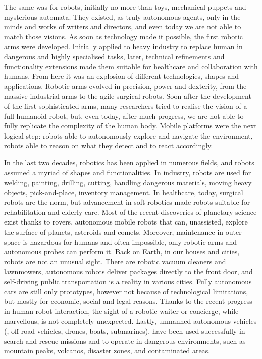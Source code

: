 The same was for robots, initially no more than toys, mechanical puppets and mysterious automata. They existed, as truly autonomous agents, only in the minds and works of writers and directors, and even today we are not able to match those visions. As soon as technology made it possible, the first robotic arms were developed. Initially applied to heavy industry to replace human in dangerous and highly specialised tasks, later, technical refinements and functionality extensions made them suitable for healthcare and collaboration with humans. From here it was an explosion of different technologies, shapes and applications. Robotic arms evolved in precision, power and dexterity,  from the massive industrial arms to the agile surgical robots.  Soon after the development of the first sophisticated arms, many researchers tried to realise the vision of a full humanoid robot, but, even today, after much progress, we are not able to fully replicate the complexity of the human body. Mobile platforms were the next logical step: robots able to autonomously explore and navigate the environment, robots able to reason on what they detect and to react accordingly.

In the last two decades, robotics has been applied in numerous fields, and robots assumed a myriad of shapes and functionalities. In industry, robots are used for welding, painting, drilling, cutting, handling dangerous materials, moving heavy objects, pick-and-place, inventory management. In healthcare, today, surgical robots are the norm, but advancement in soft robotics made robots suitable for rehabilitation and elderly care. Most of the recent discoveries of planetary science exist thanks to rovers, autonomous mobile robots that can, unassisted, explore the surface of planets, asteroids and comets. Moreover, maintenance in outer space is hazardous for humans and often impossible, only robotic arms and autonomous probes can perform it. Back on Earth, in our houses and cities, robots are not an unusual sight. There are robotic vacuum cleaners and lawnmowers,  autonomous robots deliver packages directly to the front door, and self-driving public transportation is a reality in various cities. Fully autonomous cars are still only prototypes, however not because of technological limitations, but mostly for economic, social and legal reasons. Thanks to the recent progress in human-robot interaction, the sight of a robotic waiter or concierge, while marvellous, is not completely unexpected. Lastly, unmanned autonomous vehicles (\eg, off-road vehicles, drones, boats, submarines),  have been used successfully in search and rescue missions and to operate in dangerous environments, such as mountain peaks, volcanos, disaster zones, and contaminated areas.

